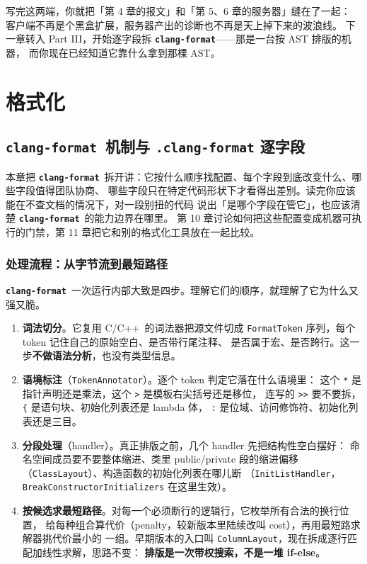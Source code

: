 \documentclass[12pt,a4paper,fontset=fandol]{ctexbook}
\newcommand{\Tp}[1]{\texttt{#1}}
\newcommand{\Bk}{\discretionary{}{}{}}
\newcommand{\Lib}[1]{\textbf{\texttt{#1}}}
\newcommand{\Lang}[1]{\textsf{#1}}
\newcommand{\CL}{\Lang{C}}
\newcommand{\CPP}{\Lang{C++}}
\newcommand{\Fmt}{\Lib{clang-format}}
\begin{document}
写完这两端，你就把「第 4 章的报文」和「第 5、6 章的服务器」缝在了一起：
客户端不再是个黑盒扩展，服务器产出的诊断也不再是天上掉下来的波浪线。
下一章转入 Part III，开始逐字段拆 \Fmt——那是一台按 AST 排版的机器，
而你现在已经知道它靠什么拿到那棵 AST。

\part{格式化}

\chapter{\Fmt\ 机制与 \texttt{.clang-format} 逐字段}\label{ch:clangformat}

本章把 \Fmt\ 拆开讲：它按什么顺序找配置、每个字段到底改变什么、哪些字段值得团队协商、
哪些字段只在特定代码形状下才看得出差别。读完你应该能在不查文档的情况下，对一段别扭的代码
说出「是哪个字段在管它」，也应该清楚 \Fmt\ 的能力边界在哪里。
第 10 章讨论如何把这些配置变成机器可执行的门禁，第 11 章把它和别的格式化工具放在一起比较。

\section{处理流程：从字节流到最短路径}\label{sec:ch09-s1}

\Fmt\ 一次运行内部大致是四步。理解它们的顺序，就理解了它为什么又强又脆。

\begin{enumerate}
  \item \textbf{词法切分}。它复用 \CL/{\Bk}\CPP\ 的词法器把源文件切成
    \Tp{FormatToken} 序列，每个 token 记住自己的原始空白、是否带行尾注释、
    是否属于宏、是否跨行。这一步\textbf{不做语法分析}，也没有类型信息。
  \item \textbf{语境标注}（\Tp{TokenAnnotator}）。逐个 token 判定它落在什么语境里：
    这个 \texttt{*} 是指针声明还是乘法，这个 \texttt{>} 是模板右尖括号还是移位，
    连写的 \texttt{>>} 要不要拆，\texttt{\{} 是语句块、初始化列表还是 lambda 体，
    \texttt{:} 是位域、访问修饰符、初始化列表还是三目。
  \item \textbf{分段处理}（handler）。真正排版之前，几个 handler 先把结构性空白摆好：
    命名空间成员要不要整体缩进、类里 public/private 段的缩进偏移
    （\Tp{ClassLayout}）、构造函数的初始化列表在哪儿断
    （\Tp{InitListHandler}，\texttt{BreakConstructorInitializers} 在这里生效）。
  \item \textbf{按候选求最短路径}。对每一个必须断行的逻辑行，它枚举所有合法的换行位置，
    给每种组合算代价（penalty，较新版本里陆续改叫 cost），再用最短路求解器挑代价最小的
    一组。早期版本的入口叫 \Tp{ColumnLayout}，现在拆成逐行匹配加线性求解，思路不变：
    \textbf{排版是一次带权搜索，不是一堆 if-else}。
\end{enumerate}
\end{document}
